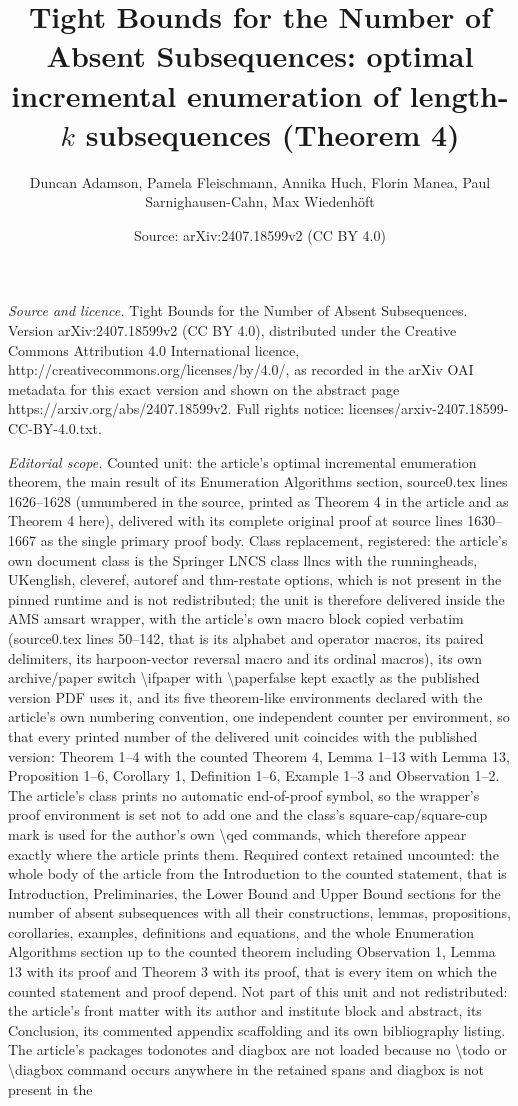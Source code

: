\documentclass[10pt,a4paper]{amsart}
\title[Tight Bounds for the Number of Absent Subsequences]{Tight Bounds for the Number of Absent Subsequences: optimal incremental enumeration of length-$k$ subsequences (Theorem 4)}
\author{Duncan Adamson, Pamela Fleischmann, Annika Huch, Florin Manea, Paul Sarnighausen-Cahn, Max Wiedenh\"oft}
\date{Source: arXiv:2407.18599v2 (CC BY 4.0)}
\theoremstyle{plain}
\theoremstyle{definition}
\begin{document}
\maketitle
\noindent\emph{Source and licence.} Tight Bounds for the Number of Absent Subsequences. Version arXiv:2407.18599v2 (CC BY 4.0), distributed under the Creative Commons Attribution 4.0 International licence, http://creativecommons.org/licenses/by/4.0/, as recorded in the arXiv OAI metadata for this exact version and shown on the abstract page https://arxiv.org/abs/2407.18599v2. Full rights notice: licenses/arxiv-2407.18599-CC-BY-4.0.txt.\par\smallskip
\noindent\textit{Editorial scope.} Counted unit: the article's optimal incremental enumeration theorem, the main result of its Enumeration Algorithms section, source0.tex lines 1626--1628 (unnumbered in the source, printed as Theorem 4 in the article and as Theorem 4 here), delivered with its complete original proof at source lines 1630--1667 as the single primary proof body. Class replacement, registered: the article's own document class is the Springer LNCS class llncs with the runningheads, UKenglish, cleveref, autoref and thm-restate options, which is not present in the pinned runtime and is not redistributed; the unit is therefore delivered inside the AMS amsart wrapper, with the article's own macro block copied verbatim (source0.tex lines 50--142, that is its alphabet and operator macros, its paired delimiters, its harpoon-vector reversal macro and its ordinal macros), its own archive/paper switch \textbackslash{}ifpaper with \textbackslash{}paperfalse kept exactly as the published version PDF uses it, and its five theorem-like environments declared with the article's own numbering convention, one independent counter per environment, so that every printed number of the delivered unit coincides with the published version: Theorem 1--4 with the counted Theorem 4, Lemma 1--13 with Lemma 13, Proposition 1--6, Corollary 1, Definition 1--6, Example 1--3 and Observation 1--2. The article's class prints no automatic end-of-proof symbol, so the wrapper's proof environment is set not to add one and the class's square-cap/square-cup mark is used for the author's own \textbackslash{}qed commands, which therefore appear exactly where the article prints them. Required context retained uncounted: the whole body of the article from the Introduction to the counted statement, that is Introduction, Preliminaries, the Lower Bound and Upper Bound sections for the number of absent subsequences with all their constructions, lemmas, propositions, corollaries, examples, definitions and equations, and the whole Enumeration Algorithms section up to the counted theorem including Observation 1, Lemma 13 with its proof and Theorem 3 with its proof, that is every item on which the counted statement and proof depend. Not part of this unit and not redistributed: the article's front matter with its author and institute block and abstract, its Conclusion, its commented appendix scaffolding and its own bibliography listing. The article's packages todonotes and diagbox are not loaded because no \textbackslash{}todo or \textbackslash{}diagbox command occurs anywhere in the retained spans and diagbox is not present in the 
\end{document}
